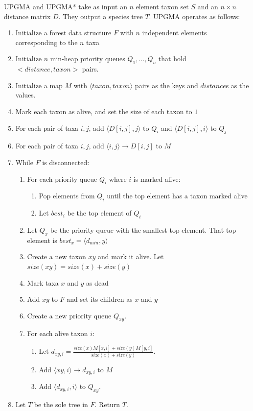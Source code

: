 UPGMA and UPGMA* take as input an $n$ element taxon set $S$ and an $n\times n$ distance matrix $D$. They output a species tree $T$. 
UPGMA operates as follows:
\begin{enumerate}
    \item Initialize a forest data structure $F$ with $n$ independent elements corresponding to the $n$ taxa
    \item Initialize $n$ min-heap priority queues $Q_1,\ldots,Q_n$ that hold $<distance, taxon>$ pairs. 
    \item Initialize a map $M$ with $\langle taxon, taxon\rangle$ pairs as the keys and $distance$s as the values. 
    \item Mark each taxon as alive, and set the size of each taxon to $1$
    \item For each pair of taxa $i,j$, add $\langle D[i,j], j\rangle$ to $Q_i$ and $\langle D[i,j], i\rangle$ to $Q_j$
    \item For each pair of taxa $i,j$, add $\langle i, j\rangle \rightarrow D[i,j]$ to $M$
    \item While $F$ is disconnected:
    \begin{enumerate}
        \item For each priority queue $Q_i$ where $i$ is marked alive:
        \begin{enumerate}
            \item Pop elements from $Q_i$ until the top element has a taxon marked alive
            \item Let $best_i$ be the top element of $Q_i$
        \end{enumerate}
        \item Let $Q_x$ be the priority queue with the smallest top element. That top element is $best_x = \langle d_{min}, y\rangle$
        \item Create a new taxon $xy$ and mark it alive. Let $size(xy) = size(x) + size(y)$
        \item Mark taxa $x$ and $y$ as dead
        \item Add $xy$ to $F$ and set its children as $x$ and $y$
        \item Create a new priority queue $Q_{xy}$. 
        \item For each alive taxon $i$:
        \begin{enumerate}
            \item Let $d_{xy,i} = \frac{size(x) M[x, i] + size(y)M[y,i]}{size(x) + size(y)}$.
            \item Add $\langle xy, i \rangle \rightarrow d_{xy, i}$ to $M$
            \item Add $\langle d_{xy, i}, i \rangle$ to $Q_{xy}$. 
        \end{enumerate}
    \end{enumerate}
    \item Let $T$ be the sole tree in $F$. Return $T$.
\end{enumerate}

